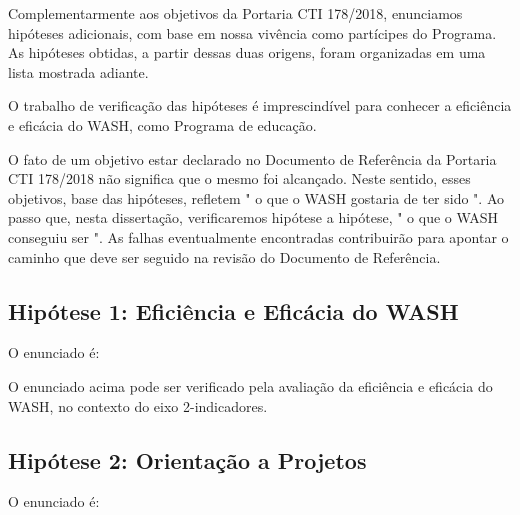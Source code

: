 Complementarmente aos objetivos da Portaria CTI 178/2018, enunciamos hipóteses adicionais, com base em nossa vivência como partícipes do Programa. As hipóteses obtidas, a partir dessas duas origens, foram organizadas em uma lista mostrada adiante.

O trabalho de verificação das hipóteses é imprescindível para conhecer a eficiência e eficácia do WASH, como Programa de educação.

O fato de um objetivo estar declarado no Documento de Referência da Portaria CTI 178/2018 não significa que o mesmo foi alcançado. Neste sentido, esses objetivos, base das hipóteses, refletem " o que o WASH gostaria de ter sido ". Ao passo que, nesta dissertação, verificaremos hipótese a hipótese, " o que o WASH conseguiu ser ". As falhas eventualmente encontradas contribuirão para apontar o caminho que deve ser seguido na revisão do Documento de Referência.

\subsection[Hipótese 1: Eficiência e Eficácia do WASH]{Hipótese 1: Eficiência e Eficácia do WASH}\label{Hipótese 1: Eficiência e Eficácia do WASH}
O enunciado é:


\noindent\begin{center}\mbox{\centering{}}\end{center}


O enunciado acima pode ser verificado pela avaliação da eficiência e eficácia do WASH, no contexto do eixo 2-indicadores.

\subsection[Hipótese 2: Orientação a Projetos]{Hipótese 2: Orientação a Projetos}\label{Hipótese 2: Orientação a Projetos}
O enunciado é:


\noindent\begin{center}\mbox{\centering{}}\end{center}


